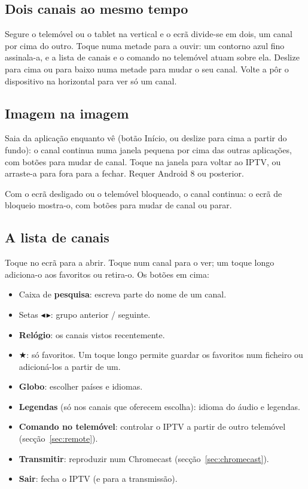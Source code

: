 \subsection{Dois canais ao mesmo tempo}
Segure o telemóvel ou o tablet na vertical e o ecrã divide-se em dois, um
canal por cima do outro. Toque numa metade para a ouvir: um contorno azul
fino assinala-a, e a lista de canais e o comando no telemóvel atuam sobre
ela. Deslize para cima ou para baixo numa metade para mudar o seu canal.
Volte a pôr o dispositivo na horizontal para ver só um canal.

\subsection{Imagem na imagem}
Saia da aplicação enquanto vê (botão Início, ou deslize para cima a partir do
fundo): o canal continua numa janela pequena por cima das outras aplicações,
com botões para mudar de canal. Toque na janela para voltar ao IPTV, ou
arraste-a para fora para a fechar. Requer Android 8 ou posterior.

Com o ecrã desligado ou o telemóvel bloqueado, o canal continua: o ecrã de
bloqueio mostra-o, com botões para mudar de canal ou parar.

\subsection{A lista de canais}
Toque no ecrã para a abrir. Toque num canal para o ver; um toque longo
adiciona-o aos favoritos ou retira-o. Os botões em cima:
\begin{itemize}
  \item Caixa de \textbf{pesquisa}: escreva parte do nome de um canal.
  \item Setas $\blacktriangleleft$\,$\blacktriangleright$: grupo anterior /
        seguinte.
  \item \textbf{Relógio}: os canais vistos recentemente.
  \item $\bigstar$: só favoritos. Um toque longo permite guardar os favoritos
        num ficheiro ou adicioná-los a partir de um.
  \item \textbf{Globo}: escolher países e idiomas.
  \item \textbf{Legendas} (só nos canais que oferecem escolha): idioma do
        áudio e legendas.
  \item \textbf{Comando no telemóvel}: controlar o IPTV a partir de outro
        telemóvel (secção~\ref{sec:remote}).
  \item \textbf{Transmitir}: reproduzir num Chromecast
        (secção~\ref{sec:chromecast}).
  \item \textbf{Sair}: fecha o IPTV (e para a transmissão).
\end{itemize}

